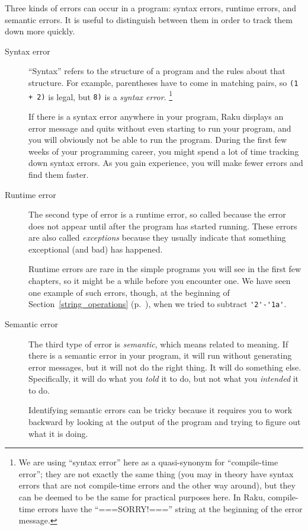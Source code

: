 Three kinds of errors can occur in a program: syntax errors, runtime 
errors, and semantic errors.  It is useful
to distinguish between them in order to track them down more quickly.

\begin{description}

\item[Syntax error] ``Syntax'' refers to the structure of a program
  and the rules about that structure.  For example, parentheses have
  to come in matching pairs, so {\tt (1 + 2)} is legal, but 
{\tt 8)} is a \emph{syntax error}. \footnote{We are using 
``syntax error'' here as a quasi-synonym for ``compile-time error''; 
they are not exactly the same thing (you may in theory have 
syntax errors that are not compile-time errors and the other way 
around), but they can be deemed to be the same for 
practical purposes here. In Raku, compile-time errors 
have the ``===SORRY!==='' string at the beginning of 
the error message.}


If there is a syntax error
anywhere in your program, Raku displays an error message and quits 
without even starting to run your program, and you will 
obviously not be able to run the program.  During the first few
weeks of your programming career, you might spend a lot of
time tracking down syntax errors.  As you gain experience, you will
make fewer errors and find them faster.


\item[Runtime error] The second type of error is a runtime error, so
  called because the error does not appear until after the program has
  started running.  These errors are also called \emph{exceptions}
  because they usually indicate that something exceptional (and bad)
  has happened.   
    

Runtime errors are rare in the simple programs you will see in the
first few chapters, so it might be a while before you encounter one. 
We have seen one example of such errors, though, at the beginning 
of Section~\ref{string_operations} (p.~\pageref{string_operations}), 
when we tried to subtract \verb"'2'-'1a'". 


\item[Semantic error] The third type of error is \emph{semantic}, which
  means related to meaning.  If there is a semantic error in your
  program, it will run without generating error messages, but it will
  not do the right thing.  It will do something else.  Specifically,
  it will do what you \emph{told} it to do, but not what you 
  \emph{intended} it to do.
   

Identifying semantic errors can be tricky because it requires you to work
backward by looking at the output of the program and trying to figure
out what it is doing.

\end{description}


